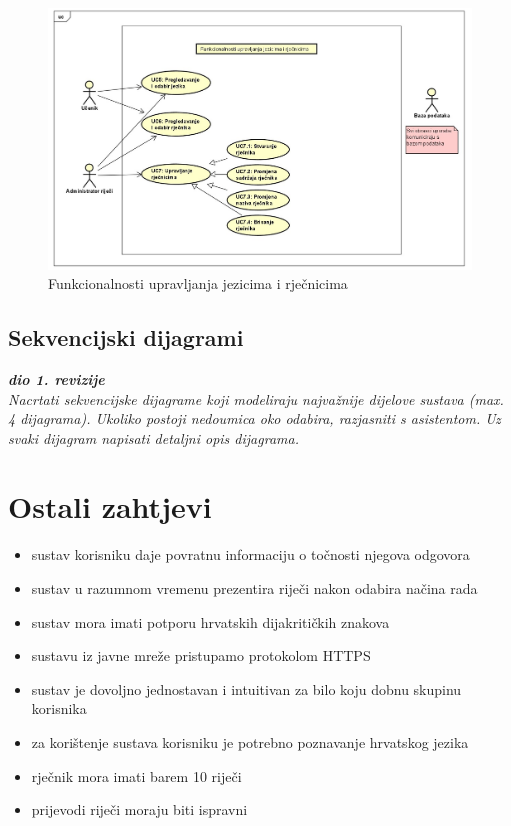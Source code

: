 					\begin{figure}[H]
						\includegraphics[scale=0.34]{dijagrami/dijagram3.jpg} 
						\centering
						\caption{Funkcionalnosti upravljanja jezicima i rječnicima}
						\label{fig:dijagram3}
					\end{figure}	
				
			\subsection{Sekvencijski dijagrami}
				
				\textbf{\textit{dio 1. revizije}}\\
				
				\textit{Nacrtati sekvencijske dijagrame koji modeliraju najvažnije dijelove sustava (max. 4 dijagrama). Ukoliko postoji nedoumica oko odabira, razjasniti s asistentom. Uz svaki dijagram napisati detaljni opis dijagrama.}
				\eject
	
				\section{Ostali zahtjevi}

				\begin{itemize}
					\item sustav korisniku daje povratnu informaciju o točnosti njegova odgovora
					\item sustav u razumnom vremenu prezentira riječi nakon odabira načina rada
					\item sustav mora imati potporu hrvatskih dijakritičkih znakova
					\item sustavu iz javne mreže pristupamo protokolom HTTPS
					\item sustav je dovoljno jednostavan i intuitivan za bilo koju dobnu skupinu korisnika 
					\item za korištenje sustava korisniku je potrebno poznavanje hrvatskog jezika
					\item rječnik mora imati barem 10 riječi
					\item prijevodi riječi moraju biti ispravni
				\end{itemize}
			 
			 
			 
	